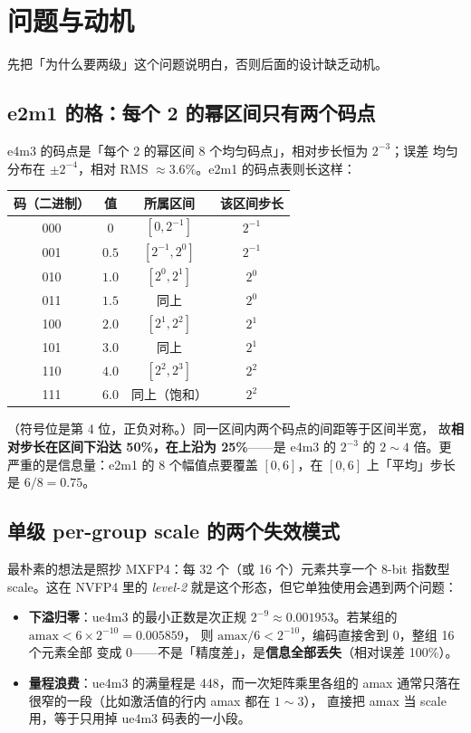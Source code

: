 \section{问题与动机}

先把「为什么要两级」这个问题说明白，否则后面的设计缺乏动机。

\subsection{e2m1 的格：每个 2 的幂区间只有两个码点}

e4m3 的码点是「每个 2 的幂区间 8 个均匀码点」，相对步长恒为 $2^{-3}$；误差
均匀分布在 $\pm 2^{-4}$，相对 RMS $\approx 3.6\%$。e2m1 的码点表则长这样：

\begin{center}
\footnotesize
\begin{tabular}{cccc}
\toprule
码（二进制） & 值 & 所属区间 & 该区间步长 \\
\midrule
000 & $0$ & $[0,2^{-1}]$ & $2^{-1}$ \\
001 & $0.5$ & $[2^{-1},2^{0}]$ & $2^{-1}$ \\
010 & $1.0$ & $[2^{0},2^{1}]$ & $2^{0}$ \\
011 & $1.5$ & 同上 & $2^{0}$ \\
100 & $2.0$ & $[2^{1},2^{2}]$ & $2^{1}$ \\
101 & $3.0$ & 同上 & $2^{1}$ \\
110 & $4.0$ & $[2^{2},2^{3}]$ & $2^{2}$ \\
111 & $6.0$ & 同上（饱和） & $2^{2}$ \\
\bottomrule
\end{tabular}
\end{center}

（符号位是第 4 位，正负对称。）同一区间内两个码点的间距等于区间半宽，
故\textbf{相对步长在区间下沿达 50\%，在上沿为 25\%}——是 e4m3 的 $2^{-3}$
的 $2\sim4$ 倍。更严重的是信息量：e2m1 的 8 个幅值点要覆盖 $[0,6]$，在
$[0,6]$ 上「平均」步长是 $6/8 = 0.75$。

\subsection{单级 per-group scale 的两个失效模式}

最朴素的想法是照抄 MXFP4：每 32 个（或 16 个）元素共享一个 8-bit 指数型
scale。这在 NVFP4 里的 \emph{level-2} 就是这个形态，但它单独使用会遇到两个问题：

\begin{itemize}[itemsep=2pt,topsep=3pt]
  \item \textbf{下溢归零}：ue4m3 的最小正数是次正规 $2^{-9} \approx
        0.001953$。若某组的 $\mathrm{amax} < 6\times 2^{-10} = 0.005859$，
        则 $\mathrm{amax}/6 < 2^{-10}$，编码直接舍到 0，整组 16 个元素全部
        变成 0——不是「精度差」，是\textbf{信息全部丢失}（相对误差 100\%）。
  \item \textbf{量程浪费}：ue4m3 的满量程是 448，而一次矩阵乘里各组的
        amax 通常只落在很窄的一段（比如激活值的行内 amax 都在 $1\sim3$），
        直接把 amax 当 scale 用，等于只用掉 ue4m3 码表的一小段。
\end{itemize}


